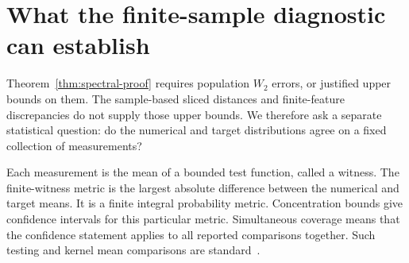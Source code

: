 \section{What the finite-sample diagnostic can establish}
\label{app:statistical}
Theorem~\ref{thm:spectral-proof} requires population $W_2$ errors, or
justified upper bounds on them. The sample-based sliced distances and
finite-feature discrepancies do not supply those upper bounds.
We therefore ask a separate statistical question: do the numerical and
target distributions agree on a fixed collection of measurements?

Each measurement is the mean of a bounded test function, called a witness.
The finite-witness metric is the largest absolute difference between the
numerical and target means. It is a finite integral probability metric.
Concentration bounds give confidence intervals for this particular metric.
Simultaneous coverage means that the confidence statement applies to all
reported comparisons together. Such testing and kernel mean comparisons
are standard~\citep{gretton2012kernel}.\AIassistance

